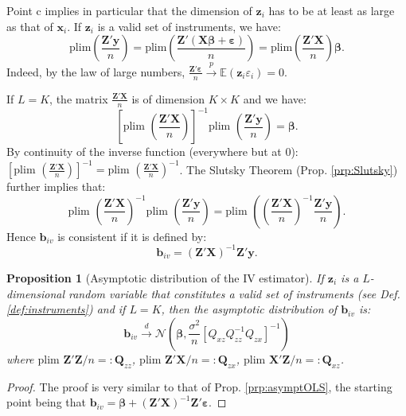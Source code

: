 \documentclass[
  12pt,
]{book}
\newtheorem{proposition}{Proposition}[chapter]
\theoremstyle{definition}
\theoremstyle{definition}
\theoremstyle{definition}
\theoremstyle{definition}
\theoremstyle{remark}
\begin{document}
Point c implies in particular that the dimension of \(\mathbf{z}_i\) has to be at least as large as that of \(\mathbf{x}_i\). If \(\mathbf{z}_i\) is a valid set of instruments, we have:
\[
\mbox{plim}\left( \frac{\mathbf{Z}'\mathbf{y}}{n} \right) =\mbox{plim}\left( \frac{\mathbf{Z}'(\mathbf{X}\boldsymbol\beta + \boldsymbol\varepsilon)}{n} \right) = \mbox{plim}\left( \frac{\mathbf{Z}'\mathbf{X}}{n} \right)\boldsymbol\beta.
\]
Indeed, by the law of large numbers, \(\frac{\mathbf{Z}'\boldsymbol\varepsilon}{n} \overset{p}{\rightarrow}\mathbb{E}(\mathbf{z}_i\varepsilon_i)=0\).

If \(L = K\), the matrix \(\frac{\mathbf{Z}'\mathbf{X}}{n}\) is of dimension \(K \times K\) and we have:
\[
\left[\mbox{plim }\left( \frac{\mathbf{Z}'\mathbf{X}}{n} \right)\right]^{-1}\mbox{plim }\left( \frac{\mathbf{Z}'\mathbf{y}}{n} \right) = \boldsymbol\beta.
\]
By continuity of the inverse function (everywhere but at 0): \(\left[\mbox{plim }\left( \frac{\mathbf{Z}'\mathbf{X}}{n} \right)\right]^{-1}=\mbox{plim }\left( \frac{\mathbf{Z}'\mathbf{X}}{n} \right)^{-1}\).
The Slutsky Theorem (Prop. \ref{prp:Slutsky}) further implies that:
\[
\mbox{plim }\left( \frac{\mathbf{Z}'\mathbf{X}}{n} \right)^{-1} \mbox{plim }\left( \frac{\mathbf{Z}'\mathbf{y}}{n} \right)  = \mbox{plim }\left( \left( \frac{\mathbf{Z}'\mathbf{X}}{n} \right)^{-1} \frac{\mathbf{Z}'\mathbf{y}}{n} \right).
\]
Hence \(\mathbf{b}_{iv}\) is consistent if it is defined by:
\[
\boxed{\mathbf{b}_{iv} = (\mathbf{Z}'\mathbf{X})^{-1}\mathbf{Z}'\mathbf{y}.}
\]

\begin{proposition}[Asymptotic distribution of the IV estimator]
\protect\hypertarget{prp:IV}{}\label{prp:IV}If \(\mathbf{z}_i\) is a \(L\)-dimensional random variable that constitutes a valid set of instruments (see Def. \ref{def:instruments}) and if \(L=K\), then the asymptotic distribution of \(\mathbf{b}_{iv}\) is:
\[
\mathbf{b}_{iv} \overset{d}{\rightarrow} \mathcal{N}\left(\boldsymbol\beta,\frac{\sigma^2}{n}\left[Q_{xz}Q_{zz}^{-1}Q_{zx}\right]^{-1}\right)
\]
where \(\mbox{plim } \mathbf{Z}'\mathbf{Z}/n =: \mathbf{Q}_{zz}\), \(\mbox{plim } \mathbf{Z}'\mathbf{X}/n =: \mathbf{Q}_{zx}\), \(\mbox{plim } \mathbf{X}'\mathbf{Z}/n =: \mathbf{Q}_{xz}\).
\end{proposition}

\begin{proof}
The proof is very similar to that of Prop. \ref{prp:asymptOLS}, the starting point being that \(\mathbf{b}_{iv} = \boldsymbol\beta + (\mathbf{Z}'\mathbf{X})^{-1}\mathbf{Z}'\boldsymbol\varepsilon\).
\end{proof}
\end{document}
